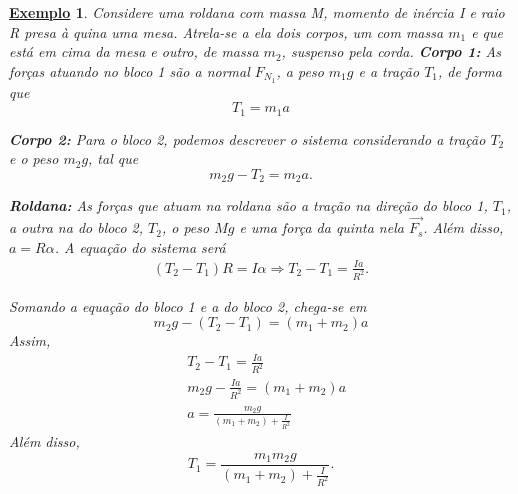 \documentclass{article}
\newtheorem{example}{\underline{Exemplo}}
\begin{document}
\begin{example}
  Considere uma roldana com massa M, momento de inércia I e raio R presa à quina uma mesa. Atrela-se a ela dois corpos, um com massa \(m_{1}\) e que está em cima da mesa
  e outro, de massa \(m_{2}\), suspenso pela corda. 
  \textbf{Corpo 1:}
  As forças atuando no bloco 1 são a normal \(F_{N_{1}}\), a peso \(m_{1}g\) e a tração \(T_{1}\), de forma que 
  \[
    T_{1}=m_{1}a
  \]

  \textbf{Corpo 2:}
  Para o bloco 2, podemos descrever o sistema considerando a tração \(T_{2}\) e o peso \(m_{2}g\), tal que 
  \[
    m_{2}g - T_{2} = m_{2}a.
  \]

  \textbf{Roldana:}
  As forças que atuam na roldana são a tração na direção do bloco 1, \(T_{1}\), a outra na do bloco 2, \(T_{2}\), o peso
  \(Mg\) e uma força da quinta nela \(\vec{F_{s}}\). Além disso, \(a=R\alpha \). A equação do sistema será
  \begin{align*}
    (T_{2}-T_{1})R = I\alpha \Rightarrow  T_{2} - T_{1} = \frac{Ia}{R^{2}}.
  \end{align*}

  Somando a equação do bloco 1 e a do bloco 2, chega-se em 
  \[
    m_{2}g - (T_{2}-T_{1}) = (m_{1}+m_{2})a
  \]
  Assim, 
  \begin{align*}
   &T_{2} - T_{1} = \frac{Ia}{R^{2}}\\
   &m_{2}g - \frac{Ia}{R^{2}} = (m_{1}+m_{2})a\\
   &a = \frac{m_{2}g}{(m_{1}+m_2) + \frac{I}{R^{2}}}
  \end{align*}
  Além disso, 
  \[
    T_{1} = \frac{m_{1}m_{2}g}{(m_{1}+m_{2})+\frac{I}{R^{2}}}.
  \]
\end{example}
\end{document}

